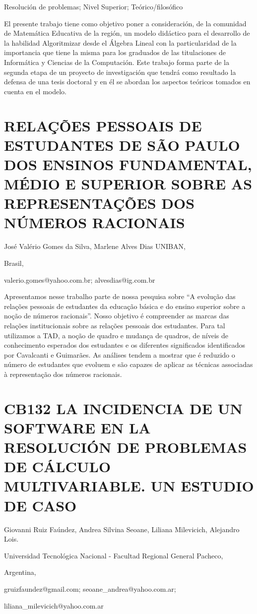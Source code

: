 Resolución de problemas; Nivel Superior; Teórico/filosófico

El presente trabajo tiene como objetivo poner a consideración, de
la comunidad de Matemática Educativa de la región, un modelo didáctico
para el desarrollo de la habilidad Algoritmizar desde el Álgebra Lineal
con la particularidad de la importancia que tiene la misma para los
graduados de las titulaciones de Informática y Ciencias de la Computación.
Este trabajo forma parte de la segunda etapa de un proyecto de investigación
que tendrá como resultado la defensa de una tesis doctoral y en él
se abordan los aspectos teóricos tomados en cuenta en el modelo.


\section{RELAÇÕES PESSOAIS DE ESTUDANTES DE SÃO PAULO DOS ENSINOS FUNDAMENTAL,
MÉDIO E SUPERIOR SOBRE AS REPRESENTAÇÕES DOS NÚMEROS RACIONAIS }

\begin{datos}

José Valério Gomes da Silva, Marlene Alves Dias UNIBAN,

Brasil,

valerio.gomes@yahoo.com.br; alvesdias@ig.com.br 

\end{datos}

Apresentamos nesse trabalho parte de nossa pesquisa sobre “A evolução
das relações pessoais de estudantes da educação básica e do ensino
superior sobre a noção de números racionais”. Nosso objetivo é compreender
as marcas das relações institucionais sobre as relações pessoais dos
estudantes. Para tal utilizamos a TAD, a noção de quadro e mudança
de quadros, de níveis de conhecimento esperados dos estudantes e os
diferentes significados identificados por Cavalcanti e Guimarães.
As análises tendem a mostrar que é reduzido o número de estudantes
que evoluem e são capazes de aplicar as técnicas associadas à representação
dos números racionais.

\setcounter{section}{131}


\section{CB132 LA INCIDENCIA DE UN SOFTWARE EN LA RESOLUCIÓN DE PROBLEMAS
DE CÁLCULO MULTIVARIABLE. UN ESTUDIO DE CASO}

\begin{datos}

Giovanni Ruiz Faúndez, Andrea Silvina Seoane, Liliana Milevicich,
Alejandro Lois.

Universidad Tecnológica Nacional - Facultad Regional General Pacheco,

Argentina,

gruizfaundez@gmail.com; seoane\_andrea@yahoo.com.ar;

liliana\_milevicich@yahoo.com.ar 

\end{datos}

